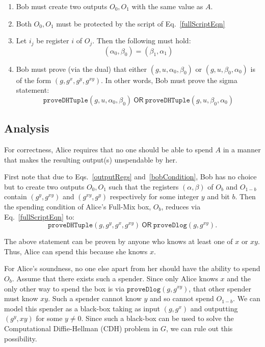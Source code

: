 \documentclass[runningheads]{llncs}
\newcommand{\ornode}{\ensuremath{\mathsf{OR}}}
\begin{document}
	\begin{enumerate}
		\item Bob must create two outputs $O_0, O_1$ with the same value as $A$. 
		\item Both $O_0, O_1$ must be protected by the script of Eq.~\ref{fullScriptEqn}
        \item Let $i_j$ be register $i$ of $O_j$. Then the following must hold: 
            \begin{equation}\label{outputRegs}
    		({\alpha}_0, {\beta}_0) = ( {\beta}_1, {\alpha}_1)
            \end{equation}
		\item Bob must prove (via the dual) that either $(g, u, {\alpha}_0, {\beta}_0)$ or $(g, u, {\beta}_0, {\alpha}_0)$ is of the form $(g, g^x, g^y, g^{xy})$. In other words, Bob must prove the sigma statement: 
    		\begin{equation}\label{bobCondition}
    		\texttt{proveDHTuple}(g, u, {\alpha}_0, {\beta}_0)~\ornode~\texttt{proveDHTuple}(g, u, {\beta}_0, {\alpha}_0)
    		\end{equation}
		
	\end{enumerate}
	
\subsection{Analysis}

For correctness, Alice requires that no one should be able to spend $A$ in a manner that makes the resulting output(s) unspendable by her.

First note that due to Eqs.~\ref{outputRegs} and~\ref{bobCondition}, Bob has no choice but to create two outputs $O_0, O_1$ such that the registers $({\alpha}, {\beta})$ of $O_b$ and $O_{1-b}$ contain $(g^y, g^{xy})$ and $(g^{xy}, g^y)$ respectively for some integer $y$ and bit $b$. Then the spending condition of Alice's Full-Mix box, $O_b$, reduces via Eq.~\ref{fullScriptEqn} to:
$$\texttt{proveDHTuple}(g, g^{y}, g^x, g^{xy}) ~\ornode~ \texttt{proveDlog}(g, g^{xy}).$$ 

The above statement can be proven by anyone who knows at least one of $x$ or $xy$. 
Thus, Alice can spend this because she knows $x$. 

For Alice's soundness, no one else apart from her should have the ability to spend $O_b$. Assume that there exists such a spender. Since only Alice knows $x$ and the only other way to spend the box is via $\texttt{proveDlog}(g, g^{xy})$, that other spender must know $xy$. Such a spender cannot know $y$ and so cannot spend $O_{1-b}$. We can model this spender as a black-box taking as input $(g, g^x)$ and outputting $(g^y, xy)$ for some $y\neq 0$. Since such a black-box can be used to solve the Computational Diffie-Hellman (CDH) problem in $G$, we can rule out this possibility.
\end{document}

